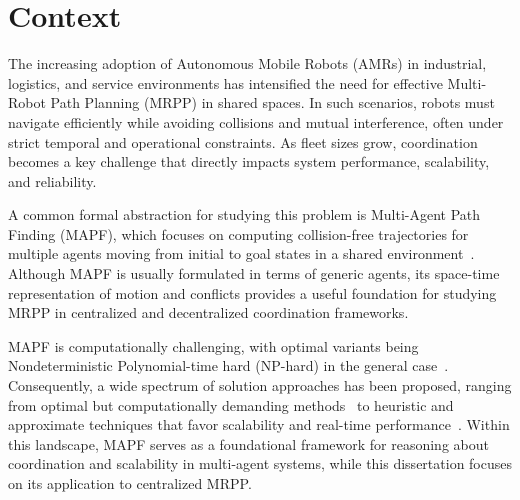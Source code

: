 \section{Context}
\hspace{\parindent}
The increasing adoption of {Autonomous Mobile Robots} (AMRs) in industrial, logistics, and service
environments has intensified the need for effective {Multi-Robot Path Planning} (MRPP) in shared
spaces. In such scenarios, robots must navigate efficiently while avoiding collisions and mutual
interference, often under strict temporal and operational constraints. As fleet sizes grow,
coordination becomes a key challenge that directly impacts system performance, scalability, and
reliability.

A common formal abstraction for studying this problem is Multi-Agent Path Finding (MAPF), which
focuses on computing collision-free trajectories for multiple agents moving from initial to goal
states in a shared environment~\cite{stern2019definitions}. Although MAPF is usually formulated in
terms of generic agents, its space-time representation of motion and conflicts provides a useful
foundation for studying MRPP in centralized and decentralized coordination frameworks.

MAPF is computationally challenging, with optimal variants being Nondeterministic
Polynomial-time hard (NP-hard) in the general case~\cite{surynek2010}. Consequently, a wide spectrum of
solution approaches has been proposed, ranging from optimal but computationally demanding
methods~\cite{sharon2015conflict,yu2013planning} to heuristic and approximate techniques that favor scalability
and real-time performance~\cite{silver2005cooperative}. Within this landscape, MAPF serves as a foundational
framework for reasoning about coordination and scalability in multi-agent
systems, while this dissertation focuses on its application to centralized MRPP.